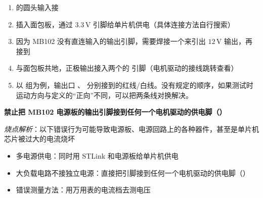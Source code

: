 \documentclass[11pt,a4paper]{article}
\begin{document}
\begin{enumerate}[label=\arabic*., itemsep=3pt]
  \item {}的圆头输入接 


  \item {}插入面包板，通过 $3.3\,\mathrm{V}$ 引脚给单片机供电（具体连接方法自行搜索）

  \item 因为 MB102 没有直连输入的输出引脚，需要焊接一个来引出 $12\,\mathrm{V}$ 输出，再接到 


  \item {} 与面包板共地，正极输出接入两个的  引脚（电机驱动的接线跳转查看）


  \item 以  组为例，输出口 、 分别接到的红线/白线。没有规定的顺序，如果测试时运动方向与定义的“正向”不同，可以把两条线对换解决。

\end{enumerate}

\quad


\begin{calloutwarning}
  \textbf{禁止把 MB102 电源板的输出引脚接到任何一个电机驱动的供电脚（）}
\end{calloutwarning}

\emph{烧点解析}：以下错误行为可能导致电源板、电源回路上的各种器件，甚至是单片机芯片被过大的电流烧坏

\begin{itemize}
  \item 多电源供电：同时用 STLink 和电源板给单片机供电
  \item 大负载电路不接独立电源：直接把引脚接到任何一个电机驱动的供电脚（）
  \item 错误测量方法：用万用表的电流档去测电压
\end{itemize}
\end{document}
